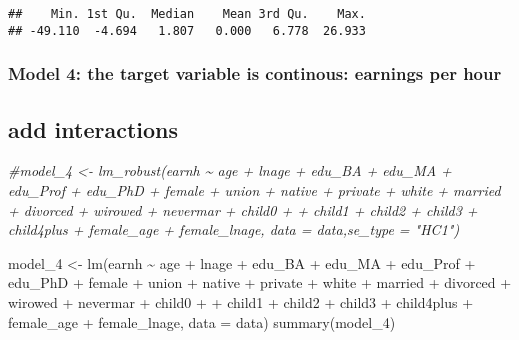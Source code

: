 \documentclass[
]{article}
\newenvironment{Shaded}{\begin{snugshade}}{\end{snugshade}}
\newcommand{\AttributeTok}[1]{\textcolor[rgb]{0.77,0.63,0.00}{#1}}
\newcommand{\CommentTok}[1]{\textcolor[rgb]{0.56,0.35,0.01}{\textit{#1}}}
\newcommand{\FunctionTok}[1]{\textcolor[rgb]{0.00,0.00,0.00}{#1}}
\newcommand{\NormalTok}[1]{#1}
\newcommand{\OtherTok}[1]{\textcolor[rgb]{0.56,0.35,0.01}{#1}}
\newcommand{\SpecialCharTok}[1]{\textcolor[rgb]{0.00,0.00,0.00}{#1}}
\begin{document}
\begin{verbatim}
##    Min. 1st Qu.  Median    Mean 3rd Qu.    Max. 
## -49.110  -4.694   1.807   0.000   6.778  26.933
\end{verbatim}

\hypertarget{model-4-the-target-variable-is-continous-earnings-per-hour}{%
\subsubsection{Model 4: the target variable is continous: earnings per
hour}\label{model-4-the-target-variable-is-continous-earnings-per-hour}}

\hypertarget{add-interactions}{%
\subsection{add interactions}\label{add-interactions}}

\begin{Shaded}
\begin{Highlighting}[]
\CommentTok{\#model\_4 \textless{}{-} lm\_robust(earnh  \textasciitilde{} age  + lnage + edu\_BA + edu\_MA + edu\_Prof + edu\_PhD + female + union + native + private + white + married + divorced + wirowed + nevermar + child0 + + child1 + child2 + child3 + child4plus + female\_age + female\_lnage, data = data,se\_type = "HC1")}

\NormalTok{model\_4 }\OtherTok{\textless{}{-}} \FunctionTok{lm}\NormalTok{(earnh  }\SpecialCharTok{\textasciitilde{}}\NormalTok{ age  }\SpecialCharTok{+}\NormalTok{ lnage }\SpecialCharTok{+}\NormalTok{ edu\_BA }\SpecialCharTok{+}\NormalTok{ edu\_MA }\SpecialCharTok{+}\NormalTok{ edu\_Prof }\SpecialCharTok{+}\NormalTok{ edu\_PhD }\SpecialCharTok{+}\NormalTok{ female }\SpecialCharTok{+}\NormalTok{ union }\SpecialCharTok{+}\NormalTok{ native }\SpecialCharTok{+}\NormalTok{ private }\SpecialCharTok{+}\NormalTok{ white }\SpecialCharTok{+}\NormalTok{ married }\SpecialCharTok{+}\NormalTok{ divorced }\SpecialCharTok{+}\NormalTok{ wirowed }\SpecialCharTok{+}\NormalTok{ nevermar }\SpecialCharTok{+}\NormalTok{ child0 }\SpecialCharTok{+} \SpecialCharTok{+}\NormalTok{ child1 }\SpecialCharTok{+}\NormalTok{ child2 }\SpecialCharTok{+}\NormalTok{ child3 }\SpecialCharTok{+}\NormalTok{ child4plus }\SpecialCharTok{+}\NormalTok{ female\_age }\SpecialCharTok{+}\NormalTok{ female\_lnage, }\AttributeTok{data =}\NormalTok{ data)}
\FunctionTok{summary}\NormalTok{(model\_4)}
\end{Highlighting}
\end{Shaded}
\end{document}
